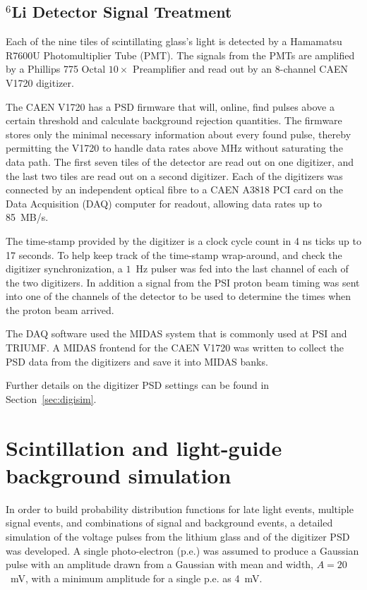 \documentclass[twocolumn]{bmcart}
\begin{document}
\subsection{$^6$Li Detector Signal Treatment}

Each of the nine tiles of scintillating glass's light is detected by a
Hamamatsu R7600U Photomultiplier Tube (PMT).  The signals from the
PMTs are amplified by a Phillips 775 Octal $10\times$ Preamplifier and
read out by an 8-channel CAEN V1720 digitizer.

The CAEN V1720 has a PSD firmware that will, online, find pulses above
a certain threshold and calculate background rejection quantities.
The firmware stores only the minimal necessary information about every
found pulse, thereby permitting the V1720 to handle data rates above
MHz without saturating the data path.  The first seven tiles of the
detector are read out on one digitizer, and the last two tiles are
read out on a second digitizer.  Each of the digitizers was connected
by an independent optical fibre to a CAEN A3818 PCI card on the Data
Acquisition (DAQ) computer for readout, allowing data rates up to
85~MB/s.

The time-stamp provided by the digitizer is a clock cycle count in 4 ns
ticks up to 17 seconds.  To help keep track of the time-stamp
wrap-around, and check the digitizer synchronization, a $1$~Hz pulser
was fed into the last channel of each of the two digitizers.  In
addition a signal from the PSI proton beam timing was sent into one of
the channels of the detector to be used to determine the times when
the proton beam arrived.

The DAQ software used the MIDAS system that is commonly used at PSI
and TRIUMF.  A MIDAS frontend for the CAEN V1720 was written to
collect the PSD data from the digitizers and save it into MIDAS banks.

Further details on the digitizer PSD settings can be found in
Section~\ref{sec:digisim}.  


\section{ Scintillation and light-guide background simulation }\label{sec:sim}

In order to build probability distribution functions for late light
events, multiple signal events, and combinations of signal and
background events, a detailed simulation of the voltage pulses from
the lithium glass and of the digitizer PSD was developed.  A single
photo-electron (p.e.) was assumed to produce a Gaussian pulse with an
amplitude drawn from a Gaussian with mean and width, $A=20$~mV, with a
minimum amplitude for a single p.e. as 4~mV.
\end{document}
